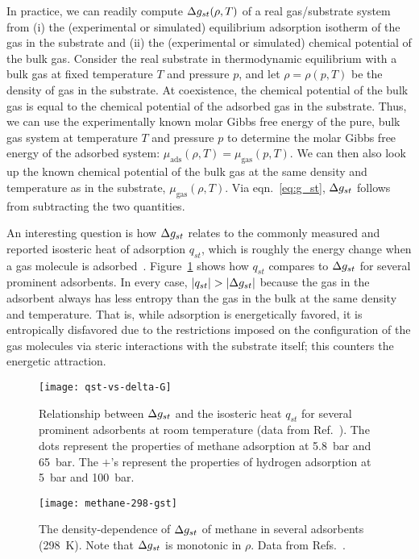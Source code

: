 In practice, we can readily compute $\Delta g_{st}(\rho, T)$ of a real gas/substrate
system from (i) the (experimental or simulated) equilibrium adsorption isotherm
of the gas in the substrate and (ii) the (experimental or simulated) chemical
potential of the bulk gas. Consider the real substrate in thermodynamic
equilibrium with a bulk gas at fixed temperature $T$ and pressure $p$, and let
$\rho=\rho(p, T)$ be the density of gas in the substrate. At coexistence, the
chemical potential of the bulk gas is equal to the chemical potential of the
adsorbed gas in the substrate. Thus, we can use the experimentally known molar
Gibbs free energy of the pure, bulk gas system at temperature $T$ and pressure
$p$ to determine the molar Gibbs free energy of the adsorbed system:
$\mu_{\text{ads}}(\rho, T)=\mu_{\text{gas}}(p, T)$. We can then also look up
the known chemical potential of the bulk gas at the same density and
temperature as in the substrate, $\mu_{\text{gas}}(\rho, T)$. Via
eqn.~\ref{eq:g_st}, $\Delta g_{st}$ follows from subtracting the two quantities.

An interesting question is how $\Delta g_{st}$ relates to the commonly measured and
reported isosteric heat of adsorption $q_{st}$, which is roughly the energy
change when a gas molecule is adsorbed~\cite{sircar1999isosteric,
tian2017differential}. Figure~\ref{fig:qst-vs-delta-G} shows how $q_{st}$
compares to $\Delta g_{st}$ for several prominent adsorbents. In every case,
$|q_{st}|>|\gst|$ because the gas in the adsorbent always has less entropy than
the gas in the bulk at the same density and temperature. That is, while
adsorption is energetically favored, it is entropically disfavored due to the
restrictions imposed on the configuration of the gas molecules via steric
interactions with the substrate itself; this counters the energetic attraction.

\begin{figure}
    \centering
    \texttt{[image: qst-vs-delta-G]}
    \caption{Relationship between $\Delta g_{st}$ and the isosteric heat
      $q_{st}$ for several prominent adsorbents at room
      temperature (data from Ref.~\cite{mason2014evaluating, garcia2018benchmark}). The dots represent the properties of methane
      adsorption at 5.8~bar and 65~bar. The $+$'s represent the
      properties of hydrogen adsorption at 5~bar and
      100~bar.}
    \label{fig:qst-vs-delta-G}
\end{figure}

\begin{figure}
    \centering
    \texttt{[image: methane-298-gst]}
    \caption{The density-dependence of $\Delta g_{st}$ of methane in several
      adsorbents (298\ K). Note that $\Delta g_{st}$ is monotonic in
      $\rho$. Data from
      Refs.~\cite{mason2014evaluating, furukawa2009storage}.
    }
    \label{fig:methane-gst}
\end{figure}

